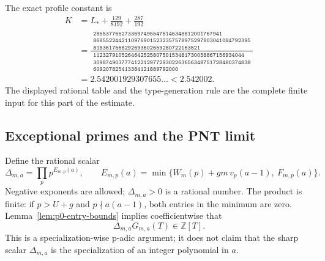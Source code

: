 The exact profile constant is
\begin{align}
 K&=L_*+\frac{129}{8192}+\frac{287}{192}\\
 &=\frac{\begin{array}{c}
 \texttt{28553776527336974955476146348812001767941}\\
 \texttt{86855224421109769015232357578975297803041084792395}\\
 \texttt{8183617568292693602659280722163521}
 \end{array}}
 {\begin{array}{c}
 \texttt{112327910526464252580750153481730058867156934044}\\
 \texttt{30987490377741221297729302263656348751728480374838}\\
 \texttt{609207825413384121889792000}
 \end{array}}\\
 &=2.542001929307655\ldots<2.542002.
\label{eq:p0-K}
\end{align}
The displayed rational table and the type-generation rule are the complete
finite input for this part of the estimate.

\subsection{Exceptional primes and the PNT limit}

Define the rational scalar
\begin{equation}\label{eq:p0-delta}
 \Delta_{m,a}=\prod_p p^{E_{m,p}(a)},\qquad
 E_{m,p}(a)=\min\{W_m(p)+gm\,v_p(a-1),\ F_{m,p}(a)\}.
\end{equation}
Negative exponents are allowed; $\Delta_{m,a}>0$ is a rational number.
The product is finite: if $p>U+g$ and $p\nmid a(a-1)$, both entries in
the minimum are zero.  Lemma~\ref{lem:p0-entry-bounds} implies
coefficientwise that
\begin{equation}\label{eq:p0-integerization}
 \Delta_{m,a}G_{m,a}(T)\in\mathbb Z[T].
\end{equation}
This is a specialization-wise p-adic argument; it does not claim that the
sharp scalar $\Delta_{m,a}$ is the specialization of an integer polynomial
in $a$.

